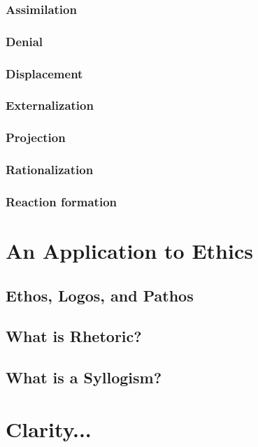 \subsubsection{Assimilation}

\subsubsection{Denial}

\subsubsection{Displacement}

\subsubsection{Externalization}

\subsubsection{Projection}

\subsubsection{Rationalization}

\subsubsection{Reaction formation}

\section{An Application to Ethics}
\subsection{Ethos, Logos, and Pathos}
\subsection{What is Rhetoric?}
\subsection{What is a Syllogism?}

\section{Clarity...}

